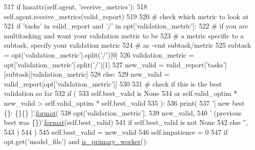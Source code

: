 \begin{DoxyCode}
517         \textcolor{keywordflow}{if} hasattr(self.agent, \textcolor{stringliteral}{'receive\_metrics'}):
518             self.agent.receive\_metrics(valid\_report)
519 
520         \textcolor{comment}{# check which metric to look at}
521         \textcolor{keywordflow}{if} \textcolor{stringliteral}{'tasks'} \textcolor{keywordflow}{in} valid\_report \textcolor{keywordflow}{and} \textcolor{stringliteral}{'/'} \textcolor{keywordflow}{in} opt[\textcolor{stringliteral}{'validation\_metric'}]:
522             \textcolor{comment}{# if you are multitasking and want your validation metric to be}
523             \textcolor{comment}{# a metric specific to a subtask, specify your validation metric}
524             \textcolor{comment}{# as -vmt subtask/metric}
525             subtask = opt[\textcolor{stringliteral}{'validation\_metric'}].split(\textcolor{stringliteral}{'/'})[0]
526             validation\_metric = opt[\textcolor{stringliteral}{'validation\_metric'}].split(\textcolor{stringliteral}{'/'})[1]
527             new\_valid = valid\_report[\textcolor{stringliteral}{'tasks'}][subtask][validation\_metric]
528         \textcolor{keywordflow}{else}:
529             new\_valid = valid\_report[opt[\textcolor{stringliteral}{'validation\_metric'}]]
530 
531         \textcolor{comment}{# check if this is the best validation so far}
532         \textcolor{keywordflow}{if} (
533             self.best\_valid \textcolor{keywordflow}{is} \textcolor{keywordtype}{None}
534             \textcolor{keywordflow}{or} self.valid\_optim * new\_valid > self.valid\_optim * self.best\_valid
535         ):
536             print(
537                 \textcolor{stringliteral}{'[ new best \{\}: \{\}\{\} ]'}.\hyperlink{namespaceparlai_1_1chat__service_1_1services_1_1messenger_1_1shared__utils_a32e2e2022b824fbaf80c747160b52a76}{format}(
538                     opt[\textcolor{stringliteral}{'validation\_metric'}],
539                     new\_valid,
540                     \textcolor{stringliteral}{' (previous best was \{\})'}.\hyperlink{namespaceparlai_1_1chat__service_1_1services_1_1messenger_1_1shared__utils_a32e2e2022b824fbaf80c747160b52a76}{format}(self.best\_valid)
541                     \textcolor{keywordflow}{if} self.best\_valid \textcolor{keywordflow}{is} \textcolor{keywordflow}{not} \textcolor{keywordtype}{None}
542                     \textcolor{keywordflow}{else} \textcolor{stringliteral}{''},
543                 )
544             )
545             self.best\_valid = new\_valid
546             self.impatience = 0
547             \textcolor{keywordflow}{if} opt.get(\textcolor{stringliteral}{'model\_file'}) \textcolor{keywordflow}{and} \hyperlink{namespaceparlai_1_1utils_1_1distributed_a9bb1dac198180590ef8c6b6c6f9fc2c4}{is\_primary\_worker}():

\end{DoxyCode}
